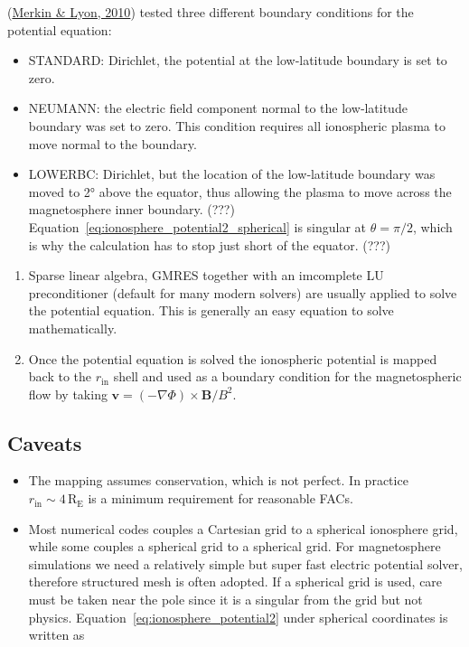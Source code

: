 \documentclass[
  notoc %
]{tufte-book}
\providecommand{\tightlist}{%
  \setlength{\itemsep}{0pt}\setlength{\parskip}{0pt}
}
\begin{document}
(\protect\hyperlink{ref-merkin2010}{Merkin \& Lyon, 2010}) tested three
different boundary conditions for the potential equation:

\begin{itemize}
\tightlist
\item
  STANDARD: Dirichlet, the potential at the low‐latitude boundary is set
  to zero.
\item
  NEUMANN: the electric field component normal to the low‐latitude
  boundary was set to zero. This condition requires all ionospheric
  plasma to move normal to the boundary.
\item
  LOWERBC: Dirichlet, but the location of the low‐latitude boundary was
  moved to 2° above the equator, thus allowing the plasma to move across
  the magnetosphere inner boundary. (???)
  Equation~\ref{eq:ionosphere_potential2_spherical} is singular at
  \(\theta=\pi/2\), which is why the calculation has to stop just short
  of the equator. (???)
\end{itemize}

\begin{enumerate}
\def\labelenumi{\arabic{enumi}.}
\setcounter{enumi}{2}
\item
  Sparse linear algebra, GMRES together with an imcomplete LU
  preconditioner (default for many modern solvers) are usually applied
  to solve the potential equation. This is generally an easy equation to
  solve mathematically.
\item
  Once the potential equation is solved the ionospheric potential is
  mapped back to the \(r_\text{in}\) shell and used as a boundary
  condition for the magnetospheric flow by taking
  \(\mathbf{v}=(-\nabla\Phi)\times\mathbf{B}/B^2\).
\end{enumerate}

\hypertarget{caveats}{%
\subsection{Caveats}\label{caveats}}

\begin{itemize}
\tightlist
\item
  The mapping assumes conservation, which is not perfect. In practice
  \(r_\text{in}\sim 4\,\text{R}_\text{E}\) is a minimum requirement for
  reasonable FACs.
\item
  Most numerical codes couples a Cartesian grid to a spherical
  ionosphere grid, while some couples a spherical grid to a spherical
  grid. For magnetosphere simulations we need a relatively simple but
  super fast electric potential solver, therefore structured mesh is
  often adopted. If a spherical grid is used, care must be taken near
  the pole since it is a singular from the grid but not physics.
  Equation~\ref{eq:ionosphere_potential2} under spherical coordinates is
  written as
\end{itemize}
\end{document}

